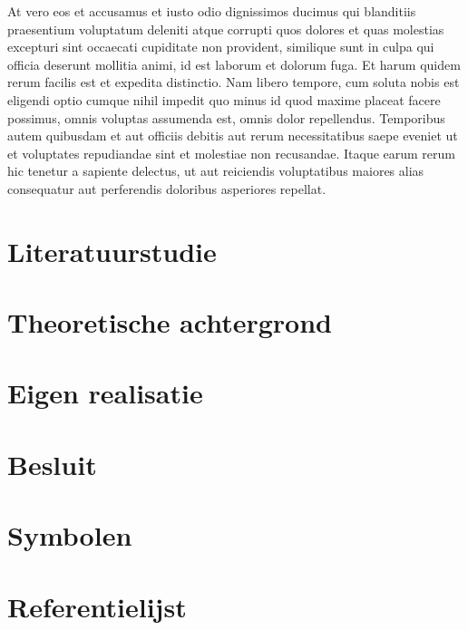\documentclass[a4paper,11pt,twoside,openright,english,copyright]{kdgmasterthesis}
\begin{document}
At vero eos et accusamus et iusto odio dignissimos ducimus qui
blanditiis praesentium voluptatum deleniti atque corrupti quos dolores
et quas molestias excepturi sint occaecati cupiditate non provident,
similique sunt in culpa qui officia deserunt mollitia animi, id est
laborum et dolorum fuga. Et harum quidem rerum facilis est et expedita
distinctio. Nam libero tempore, cum soluta nobis est eligendi optio
cumque nihil impedit quo minus id quod maxime placeat facere possimus,
omnis voluptas assumenda est, omnis dolor repellendus. Temporibus
autem quibusdam et aut officiis debitis aut rerum necessitatibus saepe
eveniet ut et voluptates repudiandae sint et molestiae non
recusandae. Itaque earum rerum hic tenetur a sapiente delectus, ut aut
reiciendis voluptatibus maiores alias consequatur aut perferendis
doloribus asperiores repellat.

\chapter{Literatuurstudie}

\chapter{Theoretische achtergrond}

\chapter{Eigen realisatie}

\chapter{Besluit}

\backmatter
\appendix

\chapter{Symbolen}
\chapter{Referentielijst}
\end{document}
